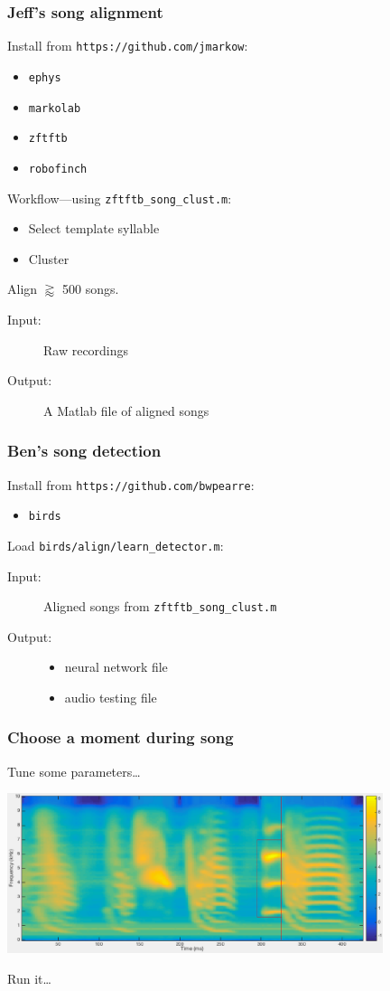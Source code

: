 \documentclass{beamer}
\begin{document}
\begin{frame}
  \frametitle{Jeff's song alignment}
  Install from {\tt https://github.com/jmarkow}:
  \begin{itemize}
    \item {\tt ephys}
    \item {\tt markolab}
    \item {\tt zftftb}
    \item {\tt robofinch}
  \end{itemize}
  Workflow---using {\tt zftftb\_song\_clust.m}:
  \begin{itemize}
    \item Select template syllable
    \item Cluster
  \end{itemize}

  \noindent Align $\gtrapprox$ 500 songs.
  \begin{description}
    \item[Input:] Raw recordings
    \item[Output:] A Matlab file of aligned songs
  \end{description}
\end{frame}

\begin{frame}
  \frametitle{Ben's song detection}
  Install from {\tt https://github.com/bwpearre}:
  \begin{itemize}
    \item {\tt birds}
  \end{itemize}
  Load {\tt birds/align/learn\_detector.m}:

  \begin{description}
    \item[Input:] Aligned songs from {\tt zftftb\_song\_clust.m}
    \item[Output:]
      \begin{itemize}
      \item neural network file
      \item audio testing file
      \end{itemize}
  \end{description}
      
\end{frame}

\begin{frame}
  \frametitle{Choose a moment during song}
  Tune some parameters\dots

  \includegraphics[width=11cm]{song-spectrogram-with-alignment-1}

  Run it\dots
\end{frame}
\end{document}
